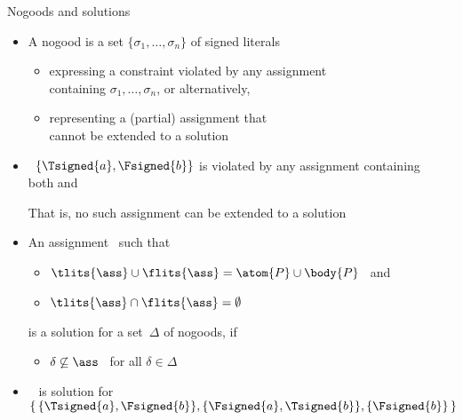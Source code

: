 \begin{frame}{Nogoods and solutions}
  \bigskip
  \begin{itemize}
  \item<2-> A \alert{nogood} is a set $\{\sigma_1,\ldots,\sigma_n\}$ of signed literals
    \begin{itemize}\normalsize
    \item<only@3-6> expressing a \alert{constraint} violated by any assignment
      \\containing $\sigma_1,\ldots,\sigma_n$, or alternatively,
    \item<only@3-6> representing a (partial) assignment that
      \\cannot be extended to a solution
      \medskip
    \end{itemize}
  \item<only@4 >  \ $\{\Tsigned{a},\Fsigned{b}\}$
    is violated by any assignment containing
    \\ both  and 
    \par\smallskip
    That is, no such assignment can be extended to a solution
  \item<only@6-> An assignment \ass\ such that
    \par\smallskip
    \begin{itemize}\normalsize
    \item \( \tlits{\ass} \cup \flits{\ass} = \atom{P}\cup\body{P} \) \ and
      \smallskip
    \item \( \tlits{\ass} \cap \flits{\ass} = \emptyset \)
    \end{itemize}
    \par\smallskip
    is a \alert{solution} for a set~$\Delta$ of nogoods,
    if
    \par\smallskip
    \begin{itemize}\normalsize
    \item $\delta\not\subseteq\ass$ \ for all $\delta\in\Delta$
    \end{itemize}
    \bigskip
  \item<only@8- >  \ 
    is  solution for
    \(
    \{\,\{\Tsigned{a},\Fsigned{b}\},\{\Fsigned{a},\Tsigned{b}\},\{\Fsigned{b}\}\,\}
    \)
  \end{itemize}
\end{frame}
